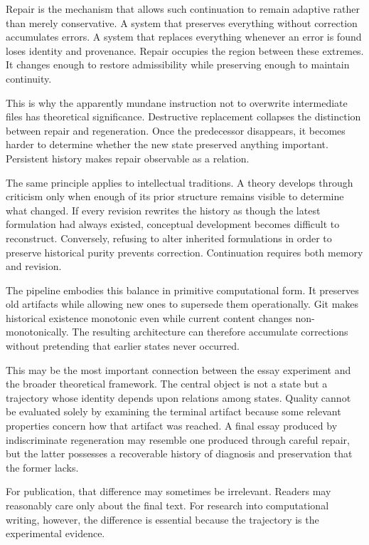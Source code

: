 \documentclass[11pt]{article}
\begin{document}
Repair is the mechanism that allows such continuation to remain adaptive rather than merely conservative. A system that preserves everything without correction accumulates errors. A system that replaces everything whenever an error is found loses identity and provenance. Repair occupies the region between these extremes. It changes enough to restore admissibility while preserving enough to maintain continuity.

This is why the apparently mundane instruction not to overwrite intermediate files has theoretical significance. Destructive replacement collapses the distinction between repair and regeneration. Once the predecessor disappears, it becomes harder to determine whether the new state preserved anything important. Persistent history makes repair observable as a relation.

The same principle applies to intellectual traditions. A theory develops through criticism only when enough of its prior structure remains visible to determine what changed. If every revision rewrites the history as though the latest formulation had always existed, conceptual development becomes difficult to reconstruct. Conversely, refusing to alter inherited formulations in order to preserve historical purity prevents correction. Continuation requires both memory and revision.

The pipeline embodies this balance in primitive computational form. It preserves old artifacts while allowing new ones to supersede them operationally. Git makes historical existence monotonic even while current content changes non-monotonically. The resulting architecture can therefore accumulate corrections without pretending that earlier states never occurred.

This may be the most important connection between the essay experiment and the broader theoretical framework. The central object is not a state but a trajectory whose identity depends upon relations among states. Quality cannot be evaluated solely by examining the terminal artifact because some relevant properties concern how that artifact was reached. A final essay produced by indiscriminate regeneration may resemble one produced through careful repair, but the latter possesses a recoverable history of diagnosis and preservation that the former lacks.

For publication, that difference may sometimes be irrelevant. Readers may reasonably care only about the final text. For research into computational writing, however, the difference is essential because the trajectory is the experimental evidence.
\end{document}
